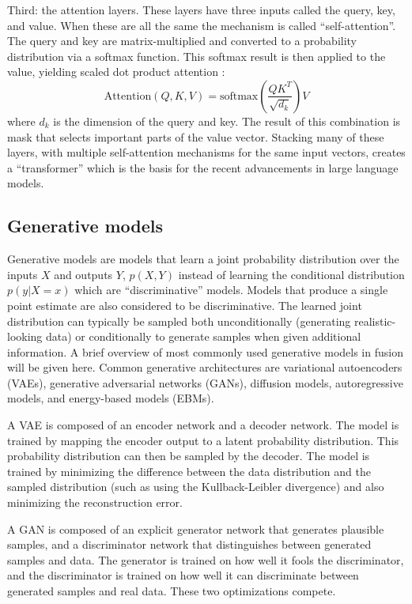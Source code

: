 Third: the attention layers. These layers have three inputs called the query, key, and value. When these are all the same the mechanism is called ``self-attention''. The query and key are matrix-multiplied and converted to a probability distribution via a softmax function. This softmax result is then applied to the value, yielding scaled dot product attention \cite{vaswani_attention_2017}: 
\begin{equation}
	\text{Attention}(Q, K, V) = \text{softmax}\left( \frac{QK^T}{\sqrt{d_k}} \right)V
\end{equation}
where $d_k$ is the dimension of the query and key.
The result of this combination is mask that selects important parts of the value vector. Stacking many of these layers, with multiple self-attention mechanisms for the same input vectors, creates a ``transformer'' \cite{vaswani_attention_2017} which is the basis for the recent advancements in large language models. 

\subsection{Generative models}
Generative models are models that learn a joint probability distribution over the inputs $X$ and outputs $Y$, $p(X, Y)$  instead of learning the conditional distribution $p(y \vert X=x)$ which are ``discriminative'' models. Models that produce a single point estimate are also considered to be discriminative. The learned joint distribution can typically be sampled both unconditionally (generating realistic-looking data) or conditionally to generate samples when given additional information. A brief overview of most commonly used generative models in fusion will be given here. Common generative architectures are variational autoencoders (VAEs), generative adversarial networks (GANs), diffusion models, autoregressive models, and energy-based models (EBMs).

A VAE \cite{kingma_auto-encoding_2022} is composed of an encoder network and a decoder network. The model is trained by mapping the encoder output to a latent probability distribution. This probability distribution can then be sampled by the decoder. The model is trained by minimizing the difference between the data distribution and the sampled distribution (such as using the Kullback-Leibler divergence) and also minimizing the reconstruction error.

A GAN \cite{goodfellow_generative_2014} is composed of an explicit generator network that generates plausible samples, and a discriminator network that distinguishes between generated samples and data. The generator is trained on how well it fools the discriminator, and the discriminator is trained on how well it can discriminate between generated samples and real data. These two optimizations compete.

